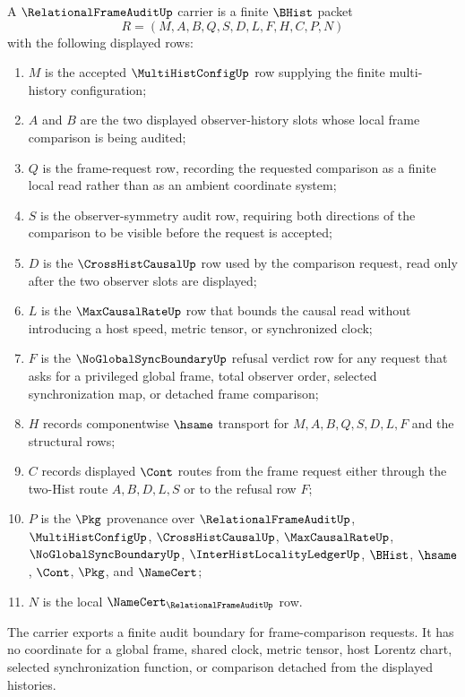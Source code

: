 \begin{definition}
\label{def:relational-frame-audit-carrier}
A $\RelationalFrameAuditUp$ carrier is a finite $\BHist$ packet
$$
R=(M,A,B,Q,S,D,L,F,H,C,P,N)
$$
with the following displayed rows:
\begin{enumerate}
\item $M$ is the accepted $\MultiHistConfigUp$ row supplying the finite multi-history configuration;
\item $A$ and $B$ are the two displayed observer-history slots whose local frame comparison is being audited;
\item $Q$ is the frame-request row, recording the requested comparison as a finite local read rather than as an ambient coordinate system;
\item $S$ is the observer-symmetry audit row, requiring both directions of the comparison to be visible before the request is accepted;
\item $D$ is the $\CrossHistCausalUp$ row used by the comparison request, read only after the two observer slots are displayed;
\item $L$ is the $\MaxCausalRateUp$ row that bounds the causal read without introducing a host speed, metric tensor, or synchronized clock;
\item $F$ is the $\NoGlobalSyncBoundaryUp$ refusal verdict row for any request that asks for a privileged global frame, total observer order, selected synchronization map, or detached frame comparison;
\item $H$ records componentwise $\hsame$ transport for $M,A,B,Q,S,D,L,F$ and the structural rows;
\item $C$ records displayed $\Cont$ routes from the frame request either through the two-Hist route $A,B,D,L,S$ or to the refusal row $F$;
\item $P$ is the $\Pkg$ provenance over $\RelationalFrameAuditUp$, $\MultiHistConfigUp$, $\CrossHistCausalUp$, $\MaxCausalRateUp$, $\NoGlobalSyncBoundaryUp$, $\InterHistLocalityLedgerUp$, $\BHist$, $\hsame$, $\Cont$, $\Pkg$, and $\NameCert$;
\item $N$ is the local $\NameCert_{\RelationalFrameAuditUp}$ row.
\end{enumerate}
The carrier exports a finite audit boundary for frame-comparison requests. It has no coordinate for a global frame, shared clock, metric tensor, host Lorentz chart, selected synchronization function, or comparison detached from the displayed histories.
\end{definition}

